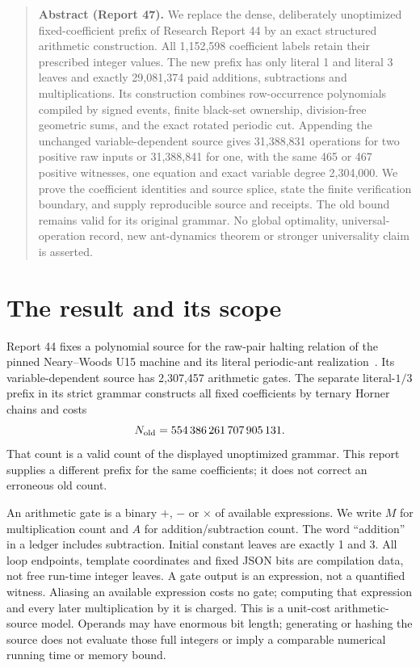 \documentclass[11pt,letterpaper]{article}
\theoremstyle{definition}\newtheorem{definition}[theorem]{Definition}
\theoremstyle{remark}\newtheorem{remark}[theorem]{Remark}
\begin{document}
\begin{quote}\small\noindent\textbf{Abstract (Report 47).} We replace the dense, deliberately unoptimized fixed-coefficient prefix of Research Report 44 by an exact structured arithmetic construction. All 1,152,598 coefficient labels retain their prescribed integer values. The new prefix has only literal 1 and literal 3 leaves and exactly 29,081,374 paid additions, subtractions and multiplications. Its construction combines row-occurrence polynomials compiled by signed events, finite black-set ownership, division-free geometric sums, and the exact rotated periodic cut. Appending the unchanged variable-dependent source gives 31,388,831 operations for two positive raw inputs or 31,388,841 for one, with the same 465 or 467 positive witnesses, one equation and exact variable degree 2,304,000. We prove the coefficient identities and source splice, state the finite verification boundary, and supply reproducible source and receipts. The old bound remains valid for its original grammar. No global optimality, universal-operation record, new ant-dynamics theorem or stronger universality claim is asserted.
\end{quote}

\section{The result and its scope}\label{ptr:sc:sec:result}
Report 44 fixes a polynomial source for the raw-pair halting relation of the pinned Neary--Woods U15 machine and its literal periodic-ant realization~\cite{ptr:sc:report44}. Its variable-dependent source has 2,307,457 arithmetic gates. The separate literal-$1/3$ prefix in its strict grammar constructs all fixed coefficients by ternary Horner chains and costs
\[
 N_{\rm old}=554\,386\,261\,707\,905\,131.
\]
That count is a valid count of the displayed unoptimized grammar. This report supplies a different prefix for the same coefficients; it does not correct an erroneous old count.

An arithmetic gate is a binary $+$, $-$ or $\times$ of available expressions. We write $M$ for multiplication count and $A$ for addition/subtraction count. The word ``addition'' in a ledger includes subtraction. Initial constant leaves are exactly 1 and 3. All loop endpoints, template coordinates and fixed JSON bits are compilation data, not free run-time integer leaves. A gate output is an expression, not a quantified witness. Aliasing an available expression costs no gate; computing that expression and every later multiplication by it is charged. This is a unit-cost arithmetic-source model. Operands may have enormous bit length; generating or hashing the source does not evaluate those full integers or imply a comparable numerical running time or memory bound.
\end{document}
